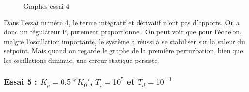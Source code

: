 \begin{figure}[H]
    \centering
    \caption{Graphes essai 4}
    \label{fig:essai-4}
\end{figure}

Dans l'essai numéro 4, le terme intégratif et dérivatif n'ont pas d'apports.
On a donc un régulateur P, purement proportionnel. On peut voir que pour 
l'échelon, malgré l'oscillation importante, le système a réussi à se stabiliser
sur la valeur du setpoint. Mais quand on regarde le graphe de la première perturbation,
bien que les oscillations diminue, une erreur statique persiste.


\subsubsection{Essai 5 : $K_{p} = 0.5*K_{0}'$, $T_{i} = 10^{5}$ et $T_{d} = 10^{-3}$}

